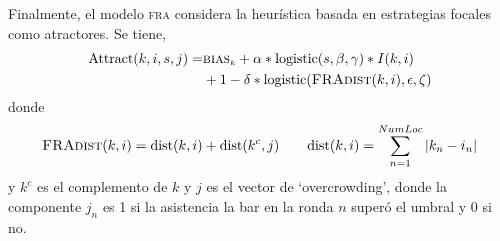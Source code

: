 \documentclass{article}
\newcommand{\attrac}{\mbox{Attract}}
\newcommand{\logi}{\mbox{logistic}}
\newcommand{\dist}{\mbox{dist}}
\newcommand{\fradist}{\mbox{\textsc{FRAdist}}}
\newcommand{\bias}[1]{\ensuremath{\mbox{\textsc{bias}$_{\mbox{\tiny ${#1}$}}$}}}
\begin{document}
Finalmente, el modelo \textsc{fra} considera la heurística basada en estrategias focales como atractores. Se tiene,
%
\begin{align}\label{eq:FRA}
\attrac(k, i, s, j)=&\bias{k} + \alpha*\logi(s,\beta,\gamma)*I(k,i)  \\
&+ 1-\delta*\logi(\fradist(k,i),\epsilon,\zeta) \nonumber
\end{align}
%
donde
%
\[
\fradist(k,i)=\dist(k,i) + \dist(k^c, j)\qquad  \dist(k,i)=\sum_{n=1}^{NumLoc}|k_n-i_n|
\]
%
y $k^c$ es el complemento de $k$ y $j$ es el vector de `overcrowding', donde la componente $j_n$ es 1 si la asistencia la bar en la ronda $n$ superó el umbral y 0 si no.  
\end{document}
